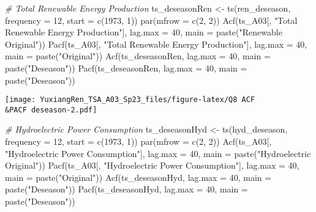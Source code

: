 \documentclass[
]{article}
\newenvironment{Shaded}{\begin{snugshade}}{\end{snugshade}}
\newcommand{\AttributeTok}[1]{\textcolor[rgb]{0.77,0.63,0.00}{#1}}
\newcommand{\CommentTok}[1]{\textcolor[rgb]{0.56,0.35,0.01}{\textit{#1}}}
\newcommand{\DecValTok}[1]{\textcolor[rgb]{0.00,0.00,0.81}{#1}}
\newcommand{\FunctionTok}[1]{\textcolor[rgb]{0.00,0.00,0.00}{#1}}
\newcommand{\NormalTok}[1]{#1}
\newcommand{\OtherTok}[1]{\textcolor[rgb]{0.56,0.35,0.01}{#1}}
\newcommand{\StringTok}[1]{\textcolor[rgb]{0.31,0.60,0.02}{#1}}
\begin{document}
\begin{Shaded}
\begin{Highlighting}[]
\CommentTok{\# Total Renewable Energy Production}
\NormalTok{ts\_deseasonRen }\OtherTok{\textless{}{-}} \FunctionTok{ts}\NormalTok{(ren\_deseason, }\AttributeTok{frequency =} \DecValTok{12}\NormalTok{, }\AttributeTok{start =} \FunctionTok{c}\NormalTok{(}\DecValTok{1973}\NormalTok{, }\DecValTok{1}\NormalTok{))}
\FunctionTok{par}\NormalTok{(}\AttributeTok{mfrow =} \FunctionTok{c}\NormalTok{(}\DecValTok{2}\NormalTok{, }\DecValTok{2}\NormalTok{))}
\FunctionTok{Acf}\NormalTok{(ts\_A03[, }\StringTok{"Total Renewable Energy Production"}\NormalTok{], }\AttributeTok{lag.max =} \DecValTok{40}\NormalTok{, }\AttributeTok{main =} \FunctionTok{paste}\NormalTok{(}\StringTok{"Renewable Original"}\NormalTok{))}
\FunctionTok{Pacf}\NormalTok{(ts\_A03[, }\StringTok{"Total Renewable Energy Production"}\NormalTok{], }\AttributeTok{lag.max =} \DecValTok{40}\NormalTok{, }\AttributeTok{main =} \FunctionTok{paste}\NormalTok{(}\StringTok{"Original"}\NormalTok{))}
\FunctionTok{Acf}\NormalTok{(ts\_deseasonRen, }\AttributeTok{lag.max =} \DecValTok{40}\NormalTok{, }\AttributeTok{main =} \FunctionTok{paste}\NormalTok{(}\StringTok{"Deseason"}\NormalTok{))}
\FunctionTok{Pacf}\NormalTok{(ts\_deseasonRen, }\AttributeTok{lag.max =} \DecValTok{40}\NormalTok{, }\AttributeTok{main =} \FunctionTok{paste}\NormalTok{(}\StringTok{"Deseason"}\NormalTok{))}
\end{Highlighting}
\end{Shaded}

\texttt{[image: YuxiangRen\_TSA\_A03\_Sp23\_files/figure-latex/Q8 ACF\\\&PACF deseason-2.pdf]}

\begin{Shaded}
\begin{Highlighting}[]
\CommentTok{\# Hydroelectric Power Consumption}
\NormalTok{ts\_deseasonHyd }\OtherTok{\textless{}{-}} \FunctionTok{ts}\NormalTok{(hyd\_deseason, }\AttributeTok{frequency =} \DecValTok{12}\NormalTok{, }\AttributeTok{start =} \FunctionTok{c}\NormalTok{(}\DecValTok{1973}\NormalTok{, }\DecValTok{1}\NormalTok{))}
\FunctionTok{par}\NormalTok{(}\AttributeTok{mfrow =} \FunctionTok{c}\NormalTok{(}\DecValTok{2}\NormalTok{, }\DecValTok{2}\NormalTok{))}
\FunctionTok{Acf}\NormalTok{(ts\_A03[, }\StringTok{"Hydroelectric Power Consumption"}\NormalTok{], }\AttributeTok{lag.max =} \DecValTok{40}\NormalTok{, }\AttributeTok{main =} \FunctionTok{paste}\NormalTok{(}\StringTok{"Hydroelectric Original"}\NormalTok{))}
\FunctionTok{Pacf}\NormalTok{(ts\_A03[, }\StringTok{"Hydroelectric Power Consumption"}\NormalTok{], }\AttributeTok{lag.max =} \DecValTok{40}\NormalTok{, }\AttributeTok{main =} \FunctionTok{paste}\NormalTok{(}\StringTok{"Original"}\NormalTok{))}
\FunctionTok{Acf}\NormalTok{(ts\_deseasonHyd, }\AttributeTok{lag.max =} \DecValTok{40}\NormalTok{, }\AttributeTok{main =} \FunctionTok{paste}\NormalTok{(}\StringTok{"Deseason"}\NormalTok{))}
\FunctionTok{Pacf}\NormalTok{(ts\_deseasonHyd, }\AttributeTok{lag.max =} \DecValTok{40}\NormalTok{, }\AttributeTok{main =} \FunctionTok{paste}\NormalTok{(}\StringTok{"Deseason"}\NormalTok{))}
\end{Highlighting}
\end{Shaded}
\end{document}
